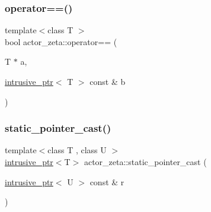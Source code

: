 \mbox{\label{namespaceactor__zeta_a5af0f10ae3a42503cbb7abd442fd640e}} 
\subsubsection{\texorpdfstring{operator==()}{operator==()}\hspace{0.1cm}{\footnotesize\ttfamily [3/3]}}
{\footnotesize\ttfamily template$<$class T $>$ \\
bool actor\+\_\+zeta\+::operator== (\begin{DoxyParamCaption}\item[{T $\ast$}]{a,  }\item[{\hyperlink{classactor__zeta_1_1intrusive__ptr}{intrusive\+\_\+ptr}$<$ T $>$ const \&}]{b }\end{DoxyParamCaption})\hspace{0.3cm}{\ttfamily [noexcept]}}

\mbox{\label{namespaceactor__zeta_a5e6e79b539107476ce1278f21f91c94d}} 
\subsubsection{\texorpdfstring{static\+\_\+pointer\+\_\+cast()}{static\_pointer\_cast()}}
{\footnotesize\ttfamily template$<$class T , class U $>$ \\
\hyperlink{classactor__zeta_1_1intrusive__ptr}{intrusive\+\_\+ptr}$<$T$>$ actor\+\_\+zeta\+::static\+\_\+pointer\+\_\+cast (\begin{DoxyParamCaption}\item[{\hyperlink{classactor__zeta_1_1intrusive__ptr}{intrusive\+\_\+ptr}$<$ U $>$ const \&}]{r }\end{DoxyParamCaption})\hspace{0.3cm}{\ttfamily [noexcept]}}

\mbox{\label{namespaceactor__zeta_ad670f36d3b7ef3abb5c18b6c297c63d0}} 
